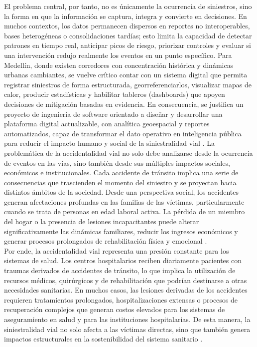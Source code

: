 El problema central, por tanto, no es únicamente la ocurrencia de siniestros, sino la forma en que la información se captura, integra y convierte en decisiones. En muchos contextos, los datos permanecen dispersos en reportes no interoperables, bases heterogéneas o consolidaciones tardías; esto limita la capacidad de detectar patrones en tiempo real, anticipar picos de riesgo, priorizar controles y evaluar si una intervención redujo realmente los eventos en un punto específico. Para Medellín, donde existen corredores con concentración histórica y dinámicas urbanas cambiantes, se vuelve crítico contar con un sistema digital que permita registrar siniestros de forma estructurada, georreferenciarlos, visualizar mapas de calor, producir estadísticas y habilitar tableros (dashboards) que apoyen decisiones de mitigación basadas en evidencia. En consecuencia, se justifica un proyecto de ingeniería de software orientado a diseñar y desarrollar una plataforma digital actualizable, con analítica geoespacial y reportes automatizados, capaz de transformar el dato operativo en inteligencia pública para reducir el impacto humano y social de la siniestralidad vial \cite{aguilar2023}.
La problemática de la accidentalidad vial no solo debe analizarse desde la ocurrencia de eventos en las vías, sino también desde sus múltiples impactos sociales, económicos e institucionales. Cada accidente de tránsito implica una serie de consecuencias que trascienden el momento del siniestro y se proyectan hacia distintos ámbitos de la sociedad. Desde una perspectiva social, los accidentes generan afectaciones profundas en las familias de las víctimas, particularmente cuando se trata de personas en edad laboral activa. La pérdida de un miembro del hogar o la presencia de lesiones incapacitantes puede alterar significativamente las dinámicas familiares, reducir los ingresos económicos y generar procesos prolongados de rehabilitación física y emocional \cite{torres2022}.\\
Por ende, la accidentalidad vial representa una presión constante para los sistemas de salud. Los centros hospitalarios reciben diariamente pacientes con traumas derivados de accidentes de tránsito, lo que implica la utilización de recursos médicos, quirúrgicos y de rehabilitación que podrían destinarse a otras necesidades sanitarias. En muchos casos, las lesiones derivadas de los accidentes requieren tratamientos prolongados, hospitalizaciones extensas o procesos de recuperación complejos que generan costos elevados para los sistemas de aseguramiento en salud y para las instituciones hospitalarias. De esta manera, la siniestralidad vial no solo afecta a las víctimas directas, sino que también genera impactos estructurales en la sostenibilidad del sistema sanitario \cite{follana2024}.\\
